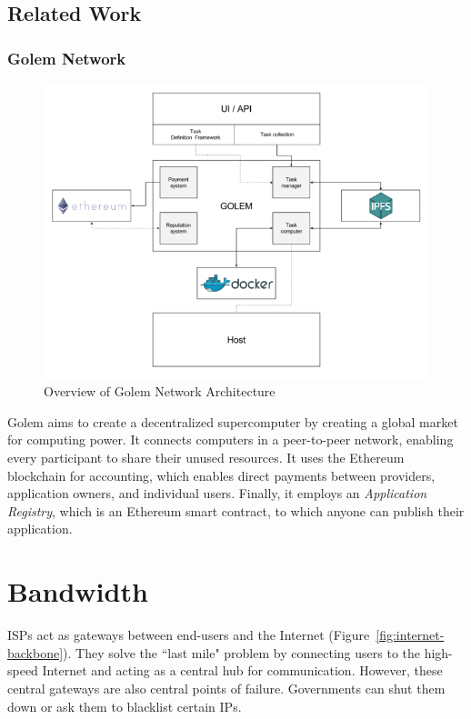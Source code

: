 	\subsection{Related Work}
		\subsubsection{Golem Network}
		\begin{figure}[h]
			\centering
			\includegraphics[width=\linewidth]{figures/golem-network}
			\caption{\label{fig:golem-network} Overview of Golem Network Architecture\protect\footnotemark}
		\end{figure}
		
		Golem\cite{golem2016whitepaper} aims to create a decentralized supercomputer by creating a global market for computing power. It connects computers in a peer-to-peer network, enabling every participant to share their unused resources. It uses the Ethereum blockchain for accounting, which enables direct payments between providers, application owners, and individual users. Finally, it employs an \textit{Application Registry}, which is an Ethereum smart contract, to which anyone can publish their application.

\cleardoublepage
\section{Bandwidth}
	ISPs act as gateways between end-users and the Internet (Figure~\ref{fig:internet-backbone}). They solve the ``last mile" problem by connecting users to the high-speed Internet and acting as a central hub for communication. However, these central gateways are also central points of failure. Governments can shut them down or ask them to blacklist certain IPs\cite{raval2016decentralized}.
	
